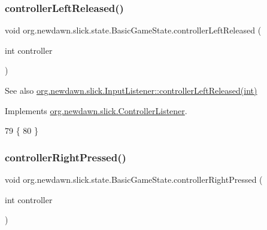 \subsubsection{\texorpdfstring{controller\+Left\+Released()}{controllerLeftReleased()}}
{\footnotesize\ttfamily void org.\+newdawn.\+slick.\+state.\+Basic\+Game\+State.\+controller\+Left\+Released (\begin{DoxyParamCaption}\item[{int}]{controller }\end{DoxyParamCaption})\hspace{0.3cm}{\ttfamily [inline]}}

\begin{DoxySeeAlso}{See also}
\mbox{\hyperlink{interfaceorg_1_1newdawn_1_1slick_1_1_controller_listener_ad2f898f0efe21771a0d9568c454dea0d}{org.\+newdawn.\+slick.\+Input\+Listener\+::controller\+Left\+Released(int)}} 
\end{DoxySeeAlso}


Implements \mbox{\hyperlink{interfaceorg_1_1newdawn_1_1slick_1_1_controller_listener_ad2f898f0efe21771a0d9568c454dea0d}{org.\+newdawn.\+slick.\+Controller\+Listener}}.


\begin{DoxyCode}
79                                                        \{
80     \}
\end{DoxyCode}
\mbox{\label{classorg_1_1newdawn_1_1slick_1_1state_1_1_basic_game_state_adb19b887e058c5a01741e39fb8aed2fa}} 
\subsubsection{\texorpdfstring{controller\+Right\+Pressed()}{controllerRightPressed()}}
{\footnotesize\ttfamily void org.\+newdawn.\+slick.\+state.\+Basic\+Game\+State.\+controller\+Right\+Pressed (\begin{DoxyParamCaption}\item[{int}]{controller }\end{DoxyParamCaption})\hspace{0.3cm}{\ttfamily [inline]}}

